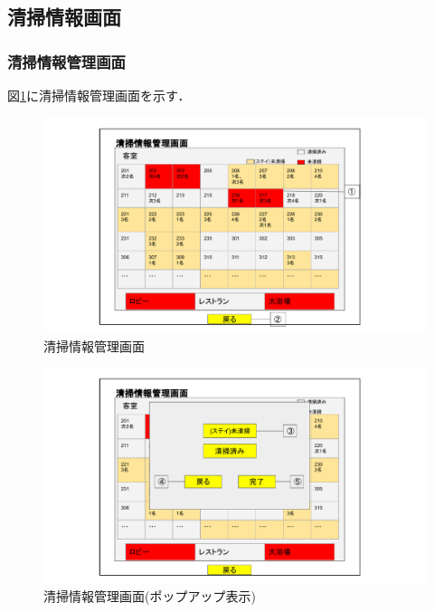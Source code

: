 ﻿
\subsection{清掃情報画面}
\subsubsection{清掃情報管理画面}

図\ref{fig:seisou01}に清掃情報管理画面を示す．

\begin{figure}[H]
 \centering
   \includegraphics[width=150mm]{UI-seisou/user-seisouMain.pdf}
 \caption{清掃情報管理画面}
 \label{fig:seisou01}
\end{figure}

\begin{figure}[H]
 \centering
   \includegraphics[width=150mm]{UI-seisou/user-cleaning01.pdf}
 \caption{清掃情報管理画面(ポップアップ表示)}
 \label{fig:seisou02}
\end{figure}


